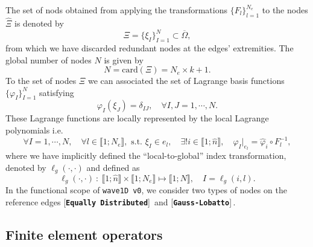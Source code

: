 \documentclass[11pt,a4paper]{article}
\newcommand{\keyword}[1]{[\texttt{\textbf{#1}}]\!\,}
\begin{document}
The set of nods obtained from applying the transformations  $\{F_l\}_{l=1}^{N_e}$ to the nodes $\widehat{\Xi}$ is denoted by
\begin{equation*}
\Xi = \{\xi_I\}_{I=1}^{N}\subset\overline{\Omega},
\end{equation*}
from which we have discarded redundant nodes at the edges' extremities. The global number of nodes $N$ is given by
\begin{equation*}
N = \mathrm{card}(\Xi) = N_e \times k + 1.
\end{equation*}
To the set of nodes $\Xi$ we can associated the set of Lagrange basis functions $\{\varphi_I\}_{I=1}^{N}$ satisfying
\begin{equation*}
\varphi_I(\xi_J) = \delta_{IJ}, \quad \forall I,J=1,\cdots,N.
\end{equation*}
These Lagrange functions are locally represented by the local Lagrange polynomials i.e.
\begin{equation*}
\forall I = 1,\cdots, N, \quad \forall l \in \llbracket 1; N_e \rrbracket,\text{ s.t. } \xi_I \in e_l ,\quad \exists! i \in \llbracket 1; \widehat{n} \rrbracket,\quad \varphi_I|_{e_l} = \widehat{\varphi}_i \circ F_l^{-1},
\end{equation*}
where we have implicitly defined the ``local-to-global'' index transformation, denoted by $\ell_g(\cdot, \cdot)$ and defined as
\begin{equation*}
\ell_g(\cdot, \cdot)~:~\llbracket 1;\widehat{n} \rrbracket\times \llbracket 1;N_e \rrbracket \mapsto \llbracket 1;N \rrbracket, \quad I = \ell_g(i, l).
\end{equation*}
In the functional scope of \texttt{wave1D v0}, we consider two types of nodes on the reference edges \keyword{Equally Distributed} and  \keyword{Gauss-Lobatto}.

\subsection{Finite element operators}
\end{document}
